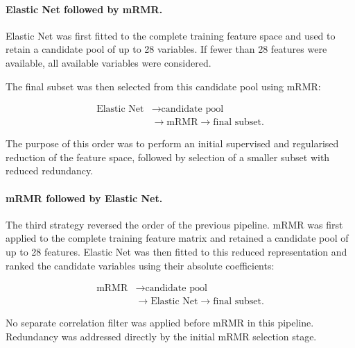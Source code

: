 \documentclass[12pt,twocolumn]{article}
\begin{document}
\paragraph{Elastic Net followed by mRMR.}

Elastic Net was first fitted to the complete training feature space
and used to retain a candidate pool of up to 28 variables. If fewer
than 28 features were available, all available variables were
considered.

The final subset was then selected from this candidate pool using
mRMR:

\begin{equation}
\begin{aligned}
\text{Elastic Net}
&\longrightarrow
\text{candidate pool}\\
&\longrightarrow
\text{mRMR}
\longrightarrow
\text{final subset}.
\end{aligned}
\label{eq:elasticnet_mrmr_pipeline}
\end{equation}

The purpose of this order was to perform an initial supervised and
regularised reduction of the feature space, followed by selection of
a smaller subset with reduced redundancy.









\paragraph{mRMR followed by Elastic Net.}

The third strategy reversed the order of the previous pipeline. mRMR
was first applied to the complete training feature matrix and retained
a candidate pool of up to 28 features. Elastic Net was then fitted to
this reduced representation and ranked the candidate variables using
their absolute coefficients:

\begin{equation}
\begin{aligned}
\text{mRMR}
&\longrightarrow
\text{candidate pool}\\
&\longrightarrow
\text{Elastic Net}
\longrightarrow
\text{final subset}.
\end{aligned}
\label{eq:mrmr_elasticnet_pipeline}
\end{equation}

No separate correlation filter was applied before mRMR in this
pipeline. Redundancy was addressed directly by the initial mRMR
selection stage.
\end{document}
